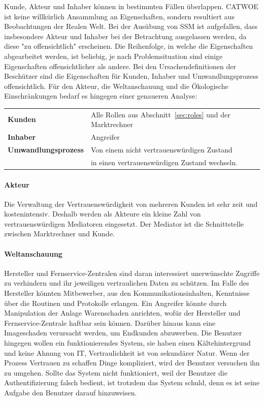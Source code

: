 \documentclass[11pt,a4paper]{report}
\begin{document}
Kunde, Akteur und Inhaber können in bestimmten Fällen überlappen. CATWOE ist keine willkürlich Ansammlung an Eigenschaften, sondern resultiert aus Beobachtungen der Realen Welt. Bei der Ausübung von SSM ist aufgefallen, dass insbesondere Akteur und Inhaber bei der Betrachtung ausgelassen werden, da diese "zu offensichtlich" erscheinen\cite{gutmann7}. Die Reihenfolge, in welche die Eigenschaften abgearbeitet werden, ist beliebig, je nach Problemsituation sind einige Eigenschaften offensichtlicher als andere. Bei den Ursachendefinitionen der Beschützer sind die Eigenschaften für Kunden, Inhaber und Umwandlungsprozess offensichtlich. Für den Akteur, die Weltanschauung und die Ökologische Einschränkungen bedarf es hingegen einer genaueren Analyse:

\begin{table}[h] %
\begin{tabular}{ll}
\textbf{Kunden} & Alle Rollen aus Abschnitt~\ref{sec:roles} und der Marktrechner\\
\textbf{Inhaber} & Angreifer\\
\textbf{Umwandlungsprozess} & 
Von einem nicht vertrauenswürdigen Zustand \\
& in einen vertrauenswürdigen Zustand wechseln.\\
\end{tabular}
\end{table}

\paragraph{Akteur} Die Verwaltung der Vertrauenswürdigkeit von mehreren Kunden ist sehr zeit und kostenintensiv. Deshalb werden als Akteure ein kleine Zahl von vertrauenswürdigen Mediatoren eingesetzt. Der Mediator ist die Schnittstelle zwischen Marktrechner und Kunde.

\paragraph{Weltanschauung} Hersteller und Fernservice-Zentralen sind daran interessiert unerwünschte Zugriffe zu verhindern und ihr jeweiligen vertraulichen Daten zu schützen. Im Falle des Hersteller könnten Mitbewerber, aus den Kommunikationsinhalten, Kenntnisse über die Routinen und Protokolle erlangen. Ein Angreifer könnte durch Manipulation der Anlage Warenschaden anrichten, wofür der Hersteller und Fernservice-Zentrale haftbar sein können. Darüber hinaus kann eine Imageschaden verursacht werden, um Endkunden abzuwerben. Die Benutzer hingegen wollen ein funktionierendes System, sie haben einen Kältehintergrund und keine Ahnung von IT, Vertraulichkeit ist von sekundärer Natur. Wenn der Prozess Vertrauen zu schaffen Dinge kompliziert, wird der Benutzer versuchen ihn zu umgehen. Sollte das System nicht funktioniert, weil der Benutzer die Authentifizierung falsch bedient, ist trotzdem das System schuld, denn es ist seine Aufgabe den Benutzer darauf hinzuweisen.
\end{document}
